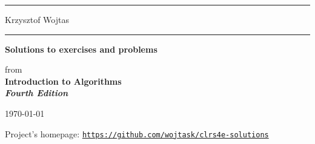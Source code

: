 \thispagestyle{empty}
\noindent\rule{\textwidth}{5pt}
Krzysztof Wojtas
\vspace{2in}
\par\noindent\rule{\textwidth}{.5pt}
{\Large\textbf{Solutions to exercises and problems}}
\vspace{.5in}
\begin{center}
    from\\[1ex]
    \Large\textbf{Introduction to Algorithms\\
    \textit{Fourth Edition}}
\end{center}
\vspace{.5in}
\par{}

\vfill

\hfill{\footnotesize\today}

\pagebreak

\hbox{}\vfill
\noindent Project's homepage: \href{https://github.com/wojtask/clrs4e-solutions}{\texttt{https://github.com/wojtask/clrs4e-solutions}}

\pagebreak
